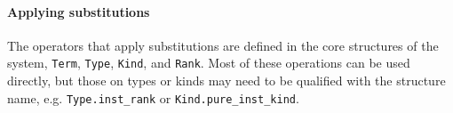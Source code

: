 \paragraph{Applying substitutions}


The \ML{} operators that apply substitutions are defined in the core
structures of the \HOLW{} system,
\texttt{Term}, \texttt{Type}, \texttt{Kind}, and \texttt{Rank}.
Most of these operations can be used directly,
but those on types or kinds may need to be
qualified with the structure name, e.g.
{\tt Type.inst\_rank} or {\tt Kind.pure\_inst\_kind}.

